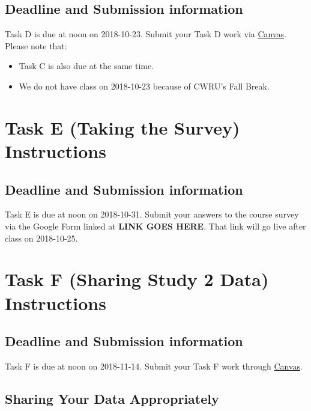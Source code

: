 \documentclass[]{book}
\providecommand{\tightlist}{%
  \setlength{\itemsep}{0pt}\setlength{\parskip}{0pt}}
\theoremstyle{definition}
\theoremstyle{definition}
\theoremstyle{definition}
\theoremstyle{remark}
\begin{document}
\hypertarget{deadline-and-submission-information-3}{%
\section{Deadline and Submission
information}\label{deadline-and-submission-information-3}}

Task D is due at noon on 2018-10-23. Submit your Task D work via
\href{https://canvas.case.edu/}{Canvas}. Please note that:

\begin{itemize}
\tightlist
\item
  Task C is also due at the same time.
\item
  We do not have class on 2018-10-23 because of CWRU's Fall Break.
\end{itemize}

\hypertarget{taskE}{%
\chapter{Task E (Taking the Survey) Instructions}\label{taskE}}

\hypertarget{deadline-and-submission-information-4}{%
\section{Deadline and Submission
information}\label{deadline-and-submission-information-4}}

Task E is due at noon on 2018-10-31. Submit your answers to the course
survey via the Google Form linked at \textbf{LINK GOES HERE}. That link
will go live after class on 2018-10-25.

\hypertarget{taskF}{%
\chapter{Task F (Sharing Study 2 Data) Instructions}\label{taskF}}

\hypertarget{deadline-and-submission-information-5}{%
\section{Deadline and Submission
information}\label{deadline-and-submission-information-5}}

Task F is due at noon on 2018-11-14. Submit your Task F work through
\href{https://canvas.case.edu/}{Canvas}.

\hypertarget{sharing-your-data-appropriately}{%
\section{Sharing Your Data
Appropriately}\label{sharing-your-data-appropriately}}
\end{document}
